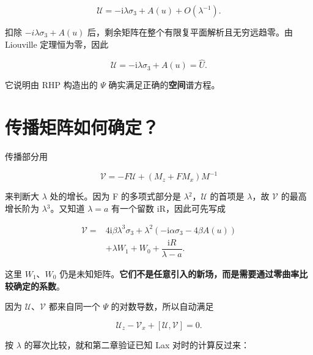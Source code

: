 \[
\mathcal U=-\mathrm{i}\lambda\sigma_3+A(u)+O(\lambda^{-1}).
\]

扣除 $-i\lambda{}\sigma{}_{3}+A(u)$ 后，剩余矩阵在整个有限复平面解析且无穷远趋零。由 Liouville 定理恒为零，因此\par

\[
\boxed{\mathcal U=-\mathrm{i}\lambda\sigma_3+A(u)=\widehat U.}
\]

它说明由 RHP 构造出的 $\Psi{}$ 确实满足正确的\textbf{空间}谱方程。\par

\section{传播矩阵如何确定？}
\par

传播部分用\par

\[
\mathcal V=-F\mathcal U+(M_z+F M_x)M^{-1}
\]

来判断大 $\lambda{}$ 处的增长。因为 F 的多项式部分是 $\lambda{}^{2}$，$\mathcal U$ 的首项是 $\lambda{}$，故 $\mathcal V$ 的最高增长阶为 $\lambda{}^{3}$。又知道 $\lambda{}=a$ 有一个留数 iR，因此可先写成\par

\[
\boxed{
\begin{aligned}
\mathcal V={}&4\mathrm{i}\beta\lambda^3\sigma_3
+\lambda^2(-\mathrm{i}\alpha\sigma_3-4\beta A(u))\\
&+\lambda W_1+W_0+\dfrac{\mathrm{i}R}{\lambda-a}.
\end{aligned}}
\]

这里 $W_{1}$、$W_{0}$ 仍是未知矩阵。\textbf{它们不是任意引入的新场，而是需要通过零曲率比较确定的系数}。\par

因为 $\mathcal U$、$\mathcal V$ 都来自同一个 $\Psi{}$ 的对数导数，所以自动满足\par

\[
\mathcal U_z-\mathcal V_x+[\mathcal U,\mathcal V]=0.
\]

按 $\lambda{}$ 的幂次比较，就和第二章验证已知 Lax 对时的计算反过来：\par

